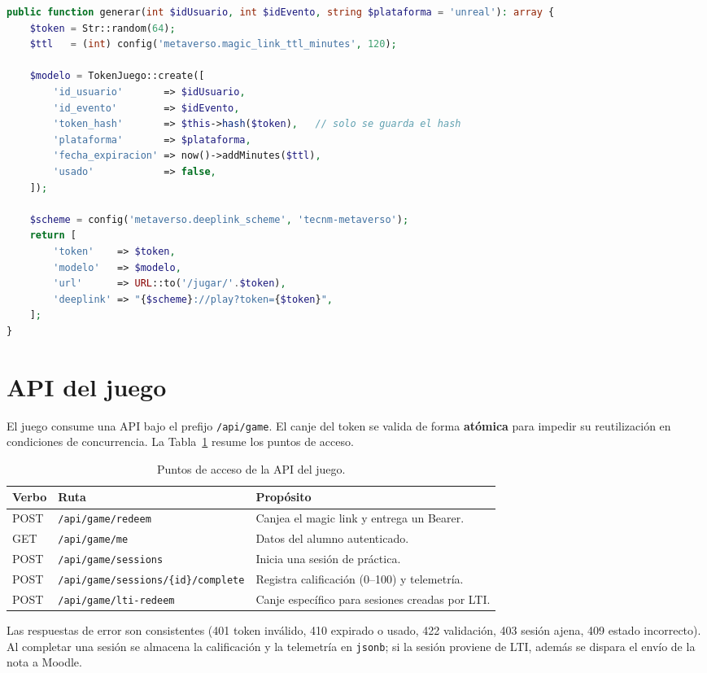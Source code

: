 \documentclass[12pt,letterpaper,oneside]{report}
\begin{document}
\begin{lstlisting}[language=PHP,caption={Generación del magic link (extracto).},label=lst:magic]
public function generar(int $idUsuario, int $idEvento, string $plataforma = 'unreal'): array {
    $token = Str::random(64);
    $ttl   = (int) config('metaverso.magic_link_ttl_minutes', 120);

    $modelo = TokenJuego::create([
        'id_usuario'       => $idUsuario,
        'id_evento'        => $idEvento,
        'token_hash'       => $this->hash($token),   // solo se guarda el hash
        'plataforma'       => $plataforma,
        'fecha_expiracion' => now()->addMinutes($ttl),
        'usado'            => false,
    ]);

    $scheme = config('metaverso.deeplink_scheme', 'tecnm-metaverso');
    return [
        'token'    => $token,
        'modelo'   => $modelo,
        'url'      => URL::to('/jugar/'.$token),
        'deeplink' => "{$scheme}://play?token={$token}",
    ];
}
\end{lstlisting}

\section{API del juego}
El juego consume una API bajo el prefijo \texttt{/api/game}. El canje del token
se valida de forma \textbf{atómica} para impedir su reutilización en condiciones
de concurrencia. La Tabla~\ref{tab:api} resume los puntos de acceso.

\begin{longtable}{p{1.3cm} p{5.4cm} p{6.4cm}}
\caption{Puntos de acceso de la API del juego.}\label{tab:api}\\
\toprule
\textbf{Verbo} & \textbf{Ruta} & \textbf{Propósito} \\ \midrule
\endhead
POST & \texttt{/api/game/redeem} & Canjea el magic link y entrega un Bearer. \\
GET & \texttt{/api/game/me} & Datos del alumno autenticado. \\
POST & \texttt{/api/game/sessions} & Inicia una sesión de práctica. \\
POST & \texttt{/api/game/sessions/\{id\}/complete} & Registra calificación (0--100) y telemetría. \\
POST & \texttt{/api/game/lti-redeem} & Canje específico para sesiones creadas por LTI. \\
\bottomrule
\end{longtable}

Las respuestas de error son consistentes (401 token inválido, 410 expirado o
usado, 422 validación, 403 sesión ajena, 409 estado incorrecto). Al completar una
sesión se almacena la calificación y la telemetría en \texttt{jsonb}; si la
sesión proviene de LTI, además se dispara el envío de la nota a Moodle.
\end{document}
